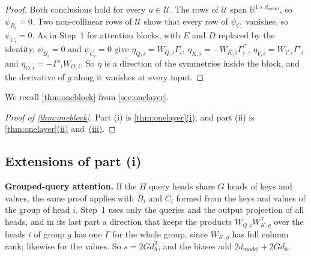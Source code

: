 \documentclass[10pt]{article}
\theoremstyle{definition}
\theoremstyle{remark}
\newcommand{\R}{\mathbb{R}}
\newcommand{\dm}{d_{\mathrm{model}}}
\newcommand{\para}[1]{\smallskip\noindent\textbf{#1}\hspace{0.5em}}
\DeclareRobustCommand{\cpref}[2]{\hyperref[#1:#2]{\cref*{#1}(#2)}}
\DeclareRobustCommand{\ptlink}[2]{\hyperref[#1:#2]{(#2)}}
\begin{document}
\begin{proof}
Both conclusions hold for every $u \in \mathcal U$. The rows of $\mathcal U$ span $\R^{1\times\dm}$, so $\psi_{B_i} = 0$. Two non-collinear rows of $\mathcal U$ show that every row of $\psi_{C_i}$ vanishes, so $\psi_{C_i} = 0$. As in Step~1 for attention blocks, with $E$ and $D$ replaced by the identity, $\psi_{B_i} = 0$ and $\psi_{C_i} = 0$ give $\eta_{Q,i} = W_{Q,i}\Gamma_i$, $\eta_{K,i} = -W_{K,i}\Gamma_i^\top$, $\eta_{V,i} = W_{V,i}\Gamma'_i$ and $\eta_{O,i} = -\Gamma'_iW_{O,i}$. So $\eta$ is a direction of the symmetries inside the block, and the derivative of $g$ along it vanishes at every input.
\end{proof}


We recall \cref{thm:oneblock} from \cref{sec:onelayer}.
\thmOneBlock*

\begin{proof}[Proof of \cref{thm:oneblock}]
Part (i) is \cpref{thm:onelayer}{i}, and part (ii) is \cpref{thm:onelayer}{ii} and~\ptlink{thm:onelayer}{iii}.
\end{proof}


\FloatBarrier
\subsection*{Extensions of part (i)}

\para{Grouped-query attention.} If the $H$ query heads share $G$ heads of keys and values, the same proof applies with $B_i$ and $C_i$ formed from the keys and values of the group of head $i$. Step~1 uses only the queries and the output projection of all heads, and in its last part a direction that keeps the products $W_{Q,i}W_{K,g}^\top$ over the heads $i$ of group $g$ has one $\Gamma$ for the whole group, since $W_{K,g}$ has full column rank; likewise for the values. So $s = 2Gd_h^2$, and the biases add $2\dm + 2Gd_h$.
\end{document}
